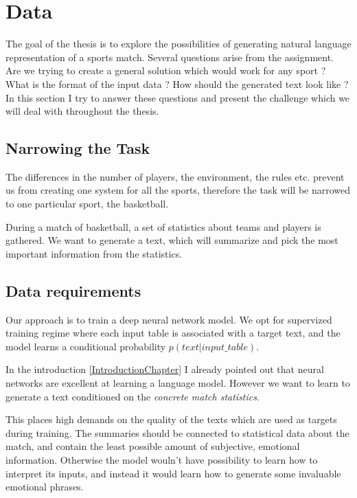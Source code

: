 \chapter{Data}

The goal of the thesis is to explore the possibilities of generating natural language representation of a sports match. Several questions arise from the assignment. Are we trying to create a general solution which would work for any sport ? What is the format of the input data ? How should the generated text look like ? In this section I try to answer these questions and present the challenge which we will deal with throughout the thesis.

\section{Narrowing the Task}
The differences in the number of players, the environment, the rules etc. prevent us from creating one system for all the sports, therefore the task will be narrowed to one particular sport, the basketball.

During a match of basketball, a set of statistics about teams and players is gathered. We want to generate a text, which will summarize and pick the most important information from the statistics.

\section{Data requirements} \label{data_requirements_section}

Our approach is to train a deep neural network model. We opt for supervized training regime where each input table is associated with a target text, and the model learns a conditional probability $p(text | input\_table)$. 

In the introduction \ref{IntroductionChapter} I already pointed out that neural networks are excellent at learning a language model. However we want to learn to generate a text conditioned on the \emph{concrete match statistics}.

This places high demands on the quality of the texts which are used as targets during training. The summaries should be connected to statistical data about the match, and contain the least possible amount of subjective, emotional information. Otherwise the model wouln't have possibility to learn how to interpret its inputs, and instead it would learn how to generate some invaluable emotional phrases.

